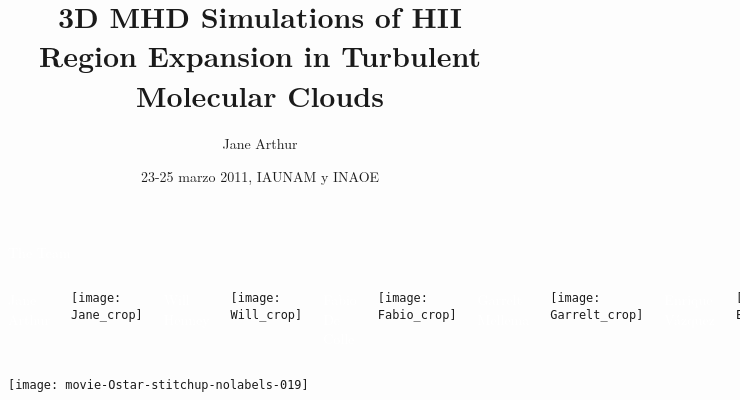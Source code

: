 \documentclass
[
]
{beamer}
\title[3D MHD Simulations of Turbulent HII Regions] %
{\Large 3D MHD Simulations of HII Region Expansion in Turbulent Molecular Clouds}
\author{Jane Arthur}
\institute[CRyA-UNAM] %
{
  Centro de Radioastronom\'{\i}a y Astrof\'{\i}sica\\
  Universidad Nacional Aut\'{o}noma de M\'exico\\
  Campus Morelia
}
\date[IAUNAM/INAOE] %
{23-25 marzo 2011, IAUNAM y INAOE}
\newcommand\white{\textcolor{white}}
\begin{document}

\newlength\movieheight
\setlength\movieheight{0.9\textheight}
\newlength\moviewidth
\setlength\moviewidth{1.1996\textheight}
\newlength\maxheight
\setlength\maxheight{0.8\textheight}


\newcommand\mymovie[1]{%
  \setkeys{Gin}{height=\movieheight}
  \includemovie
  [
  autoplay,
  autopause,
  repeat
  ]
  {\moviewidth}{\movieheight}{#1}
}

{
\begin{frame}[plain]
  \titlepage
\end{frame}
}
{
\begin{frame}[plain]
\centerline{\Large \white{The Team}}
\vspace*{0.03\textheight}
\begin{columns}
\centerline{\white{Jane Arthur}}
\vspace*{0.005\textheight}

\centerline{\texttt{[image: Jane\_crop]}}
\centerline{\white{Will Henney}}
\vspace*{0.005\textheight}

\centerline{\texttt{[image: Will\_crop]}}
\centerline{\white{Fabio De Colle}}
\vspace*{0.005\textheight}

\centerline{\texttt{[image: Fabio\_crop]}}
\centerline{\white{Garrelt Mellema}}
\vspace*{0.005\textheight}

\centerline{\texttt{[image: Garrelt\_crop]}}
\centerline{\white{Enrique V\'azquez}}
\vspace*{0.005\textheight}

\centerline{\texttt{[image: Enrique\_crop]}}
\end{columns}
\end{frame}
}
{
\begin{frame}[plain]
\centering
\centerline{\texttt{[image: movie-Ostar-stitchup-nolabels-019]}}
\end{frame}
}
\end{document}
